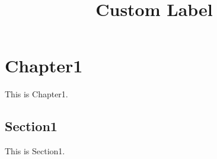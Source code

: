 \documentclass[a4paper,11pt,oneside,openany,report]{jsbook}
\title{Custom Label}
\begin{document}
\maketitle
\chapter{Chapter1}\label{chapterone}
This is Chapter1.

\section{Section1}\label{sectionone}
This is Section1.
\end{document}
